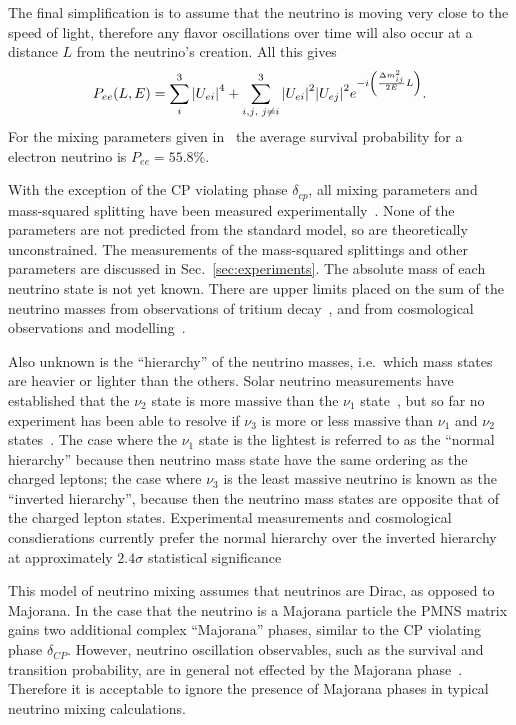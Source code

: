 The final simplification is to assume that the neutrino is moving very close
to the speed of light, therefore any flavor oscillations over time will also
occur at a distance $L$ from the neutrino's creation.
All this gives
\begin{equation}
    \label{eqn:pee_adiabatic}
    P_{ee}(L,E) = \sum_{i}^{3}\abs{U_{ei}}^4 +
    \sum_{i,j\text{, }j \ne i}^{3}
    \abs{U_{ei}}^2\abs{U_{ej}}^2e^{-i\left(\frac{\Delta m^{2}_{ij}}{2E}L\right)}\text{.}
\end{equation}
For the mixing parameters given in~\cite{PDG2016} the average survival probability
for a electron neutrino is $P_{ee} = 55.8\%$.

With the exception of the CP violating phase $\delta_{cp}$, all mixing
parameters and mass-squared splitting have been measured experimentally~\cite{pdg_globalfit}.
None of the parameters are not predicted from the standard model, so are theoretically
unconstrained.
The measurements of the mass-squared splittings and
other parameters are discussed in Sec.~\ref{sec:experiments}.
The absolute mass of each neutrino state is not yet known.
There are upper limits placed on the sum of the neutrino masses from
observations of tritium decay~\cite{troitsk_mass}, and from cosmological
observations and modelling~\cite{cosmological_neutrino_mass}.

Also unknown is the ``hierarchy'' of the neutrino masses, i.e.\ which
mass states are heavier or lighter than the others.
Solar neutrino measurements have established that the $\nu_{2}$ state
is more massive than the $\nu_{1}$ state~\cite{sno_first, sno_combined}, but so far no experiment has been
able to resolve if $\nu_{3}$ is more or less massive than $\nu_{1}$ and $\nu_{2}$ states~\cite{vogel_hierarchy}.
The case where the $\nu_{1}$ state is the lightest is referred to as the
``normal hierarchy'' because then neutrino mass state have the same
ordering as the charged leptons;
the case where $\nu_{3}$ is the least massive neutrino is known as the
 ``inverted hierarchy'', because then the neutrino mass states are opposite
 that of the charged lepton states.
 Experimental measurements and cosmological consdierations currently prefer
 the normal hierarchy over the inverted hierarchy at approximately $2.4\sigma$ statistical
 significance~\cite{nu_fit}

This model of neutrino mixing assumes that neutrinos are Dirac, as opposed to
Majorana. In the case that the neutrino is a Majorana particle the PMNS matrix
gains two additional complex ``Majorana'' phases, similar to the CP violating
phase $\delta_{CP}$.
However, neutrino oscillation observables, such as the survival and transition
probability, are in general not effected by the Majorana phase~\cite{majorana_mixing}.
Therefore it is acceptable to ignore the presence of Majorana phases in typical 
neutrino mixing calculations.

